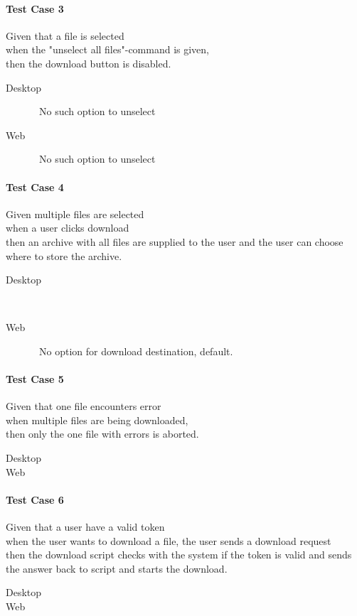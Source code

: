 \paragraph*{Test Case 3}
Given that a file is selected \\ when the "unselect all files"-command is given,
 \\ then the download button is disabled.
\begin{description}
 \item[Desktop] \xmark\ No such option to unselect
 \item[Web] \xmark\ No such option to unselect
\end{description}
\paragraph*{Test Case 4}
Given multiple files are selected \\ when a user clicks download \\ then an archive with all files are supplied to the user and the user can choose where to store the archive.
\begin{description}
 \item[Desktop] \cmark\
 \item[Web] \xmark\ No option for download destination, default.
\end{description}
\paragraph*{Test Case 5}
Given that one file encounters error \\ when multiple files are being downloaded, \\ then only the one file with errors is aborted.
\begin{description}
 \item[Desktop] 
 \item[Web]
\end{description}
\paragraph*{Test Case 6}
Given that a user have a valid token \\ when the user wants to download a file, the user sends a download request \\ then the download script checks with the system if the token is valid and sends the answer back to script and starts the download.
\begin{description}
 \item[Desktop]
 \item[Web]
\end{description}
